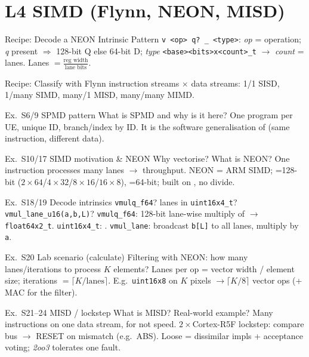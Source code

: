 \section{L4 SIMD (Flynn, NEON, MISD)}

\begin{KR}{Recipe: Decode a NEON Intrinsic}
    Pattern \texttt{v <op> q? \_ <type>}: \emph{op} = operation; \emph{q} present $\Rightarrow$ 128-bit Q else 64-bit D; \emph{type} \texttt{<base><bits>x<count>\_t} $\to$ \emph{count} = lanes. Lanes $=\tfrac{\text{reg width}}{\text{lane bits}}$.
\end{KR}

\begin{KR}{Recipe: Classify with Flynn}
    instruction streams $\times$ data streams: 1/1 SISD, 1/many SIMD, many/1 MISD, many/many MIMD.
\end{KR}

\begin{example2}{Ex.\ S6/9 SPMD pattern}
    What is SPMD and why is it here?
    \tcblower
    One program per UE, unique ID, branch/index by ID. It is the software generalisation of  (same instruction, different data).
\end{example2}

\begin{example2}{Ex.\ S10/17 SIMD motivation \& NEON}
    Why vectorise? What is NEON?
    \tcblower
    One instruction processes many lanes $\to$ throughput. NEON = ARM SIMD; =128-bit ($2{\times}64$/$4{\times}32$/$8{\times}16$/$16{\times}8$), =64-bit; built on , no divide.
\end{example2}

\begin{example2}{Ex.\ S18/19 Decode intrinsics}
    \texttt{vmulq\_f64}? lanes in \texttt{uint16x4\_t}? \texttt{vmul\_lane\_u16(a,b,L)}?
    \tcblower
    \texttt{vmulq\_f64}: 128-bit lane-wise multiply of  $\to$ \texttt{float64x2\_t}. \texttt{uint16x4\_t}: . \texttt{vmul\_lane}: broadcast \texttt{b[L]} to all lanes, multiply by \texttt{a}.
\end{example2}

\begin{example2}{Ex.\ S20 Lab scenario (calculate)}
    Filtering with NEON: how many lanes/iterations to process $K$ elements?
    \tcblower
    Lanes per op = vector width / element size; iterations $=\lceil K/\text{lanes}\rceil$. E.g.\ \texttt{uint16x8} on $K$ pixels $\to \lceil K/8\rceil$ vector ops (+ MAC for the filter).
\end{example2}

\begin{example2}{Ex.\ S21--24 MISD / lockstep}
    What is MISD? Real-world example?
    \tcblower
    Many instructions on one data stream, for  not speed.  $2{\times}$Cortex-R5F lockstep: compare bus $\to$ RESET on mismatch (e.g.\ ABS). Loose = dissimilar impls + acceptance voting; \emph{2oo3} tolerates one fault.
\end{example2}
